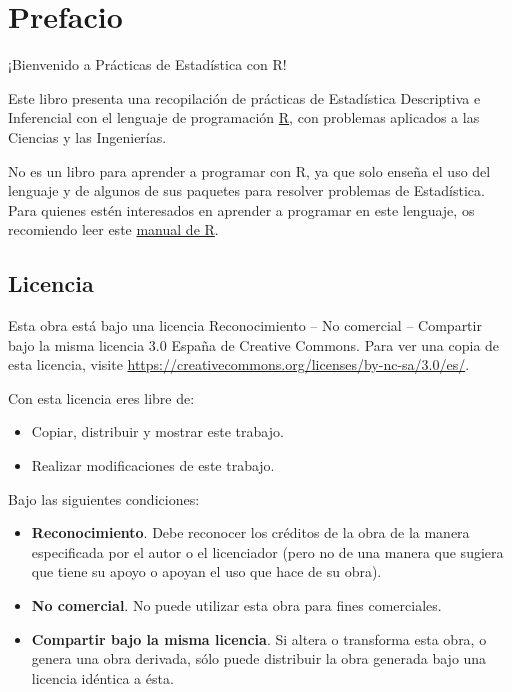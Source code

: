 \documentclass[
  a4paper,
]{scrreport}
\providecommand{\tightlist}{%
  \setlength{\itemsep}{0pt}\setlength{\parskip}{0pt}}\usepackage{longtable,booktabs,array}
\begin{document}
\hypertarget{prefacio}{%
\chapter*{Prefacio}\label{prefacio}}


¡Bienvenido a Prácticas de Estadística con R!

Este libro presenta una recopilación de prácticas de Estadística
Descriptiva e Inferencial con el lenguaje de programación
\href{https://www.r-project.org/}{R}, con problemas aplicados a las
Ciencias y las Ingenierías.

No es un libro para aprender a programar con R, ya que solo enseña el
uso del lenguaje y de algunos de sus paquetes para resolver problemas de
Estadística. Para quienes estén interesados en aprender a programar en
este lenguaje, os recomiendo leer este
\href{https://aprendeconalf.es/manual-r/}{manual de R}.

\hypertarget{licencia}{%
\section*{Licencia}\label{licencia}}


Esta obra está bajo una licencia Reconocimiento -- No comercial --
Compartir bajo la misma licencia 3.0 España de Creative Commons. Para
ver una copia de esta licencia, visite
\url{https://creativecommons.org/licenses/by-nc-sa/3.0/es/}.

Con esta licencia eres libre de:

\begin{itemize}
\tightlist
\item
  Copiar, distribuir y mostrar este trabajo.
\item
  Realizar modificaciones de este trabajo.
\end{itemize}

Bajo las siguientes condiciones:

\begin{itemize}
\item
  \textbf{Reconocimiento}. Debe reconocer los créditos de la obra de la
  manera especificada por el autor o el licenciador (pero no de una
  manera que sugiera que tiene su apoyo o apoyan el uso que hace de su
  obra).
\item
  \textbf{No comercial}. No puede utilizar esta obra para fines
  comerciales.
\item
  \textbf{Compartir bajo la misma licencia}. Si altera o transforma esta
  obra, o genera una obra derivada, sólo puede distribuir la obra
  generada bajo una licencia idéntica a ésta.
\end{itemize}
\end{document}
